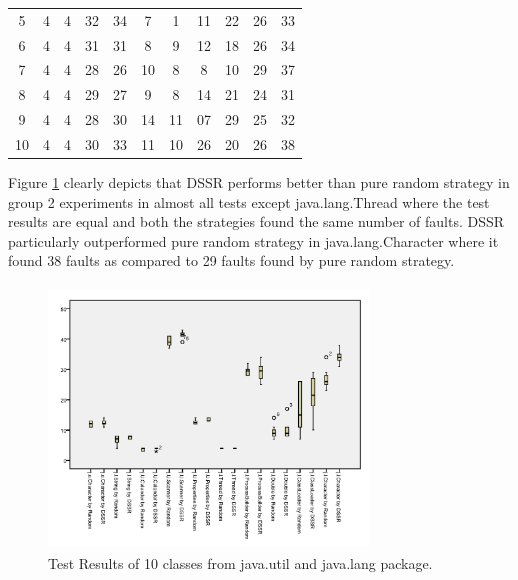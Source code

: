\documentclass[10pt, conference, compsocconf]{IEEEtran}
\begin{document}
\begin{table}[ht]
\begin{tabular}{| c | c | c | c | c | c | c | c | c | c | c |}
5 & 4 & 4 & 32 & 34 & 7 & 1 & 11 & 22 & 26 & 33\\

6 & 4 & 4 & 31 & 31 & 8 & 9 & 12 & 18 & 26 & 34\\

7 & 4 & 4 & 28 & 26 & 10 & 8 & 8 & 10 & 29 & 37\\

8 & 4 & 4 & 29 & 27 & 9 & 8 & 14 & 21 & 24 & 31\\

9 & 4 & 4 & 28 & 30 & 14 & 11 & 07 & 29 & 25 & 32\\ 

10 & 4 & 4 & 30 & 33 & 11 & 10 & 26 & 20 & 26 & 38\\ [1ex] %

\hline %
\end{tabular}
\label{table:tenb} %
\end{table}

\newpage

Figure \ref{fig:Result2} clearly depicts that DSSR performs better than pure random strategy in group 2 experiments in almost all tests except java.lang.Thread where the test results are equal and both the strategies found the same number of faults. DSSR particularly outperformed pure random strategy in java.lang.Character where it found 38 faults as compared to 29 faults found by pure random strategy.\\

\begin{figure}[htp]
\centering
\includegraphics[width=8.5cm,height=7cm]{javatests.png}
\caption{Test Results of 10 classes from java.util and java.lang package.}
\label{fig:Result2}
\end{figure}

\newpage
\end{document}
